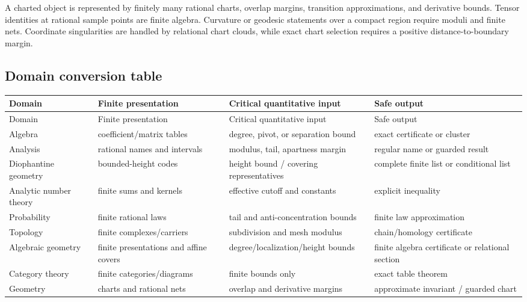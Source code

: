 A charted object is represented by finitely many rational charts, overlap
margins, transition approximations, and derivative bounds.  Tensor identities
at rational sample points are finite algebra.  Curvature or geodesic
statements over a compact region require moduli and finite nets.  Coordinate
singularities are handled by relational chart clouds, while exact chart
selection requires a positive distance-to-boundary margin.

\subsection{Domain conversion table}

\begin{longtable}{@{}p{}p{}p{}p{}@{}}
\toprule
Domain & Finite presentation & Critical quantitative input & Safe output \\
\midrule
\endfirsthead
\toprule
Domain & Finite presentation & Critical quantitative input & Safe output \\
\midrule
\endhead
Algebra & coefficient/matrix tables & degree, pivot, or separation bound & exact certificate or cluster \\
Analysis & rational names and intervals & modulus, tail, apartness margin & regular name or guarded result \\
Diophantine geometry & bounded-height codes & height bound / covering representatives & complete finite list or conditional list \\
Analytic number theory & finite sums and kernels & effective cutoff and constants & explicit inequality \\
Probability & finite rational laws & tail and anti-concentration bounds & finite law approximation \\
Topology & finite complexes/carriers & subdivision and mesh modulus & chain/homology certificate \\
Algebraic geometry & finite presentations and affine covers & degree/localization/height bounds & finite algebra certificate or relational section \\
Category theory & finite categories/diagrams & finite bounds only & exact table theorem \\
Geometry & charts and rational nets & overlap and derivative margins & approximate invariant / guarded chart \\
\bottomrule
\end{longtable}
